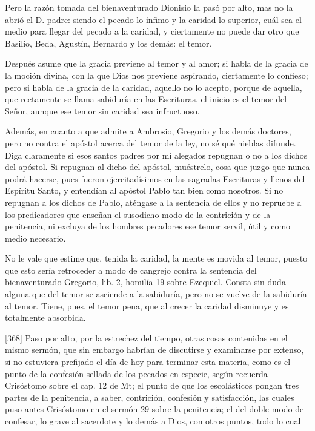 Pero la razón tomada del bienaventurado Dionisio la pasó por alto, mas no la abrió el D. padre: siendo el pecado lo ínfimo y la caridad lo superior, cuál sea el medio para llegar del pecado a la caridad, y ciertamente no puede dar otro que Basilio, Beda, Agustín, Bernardo y los demás: el temor.

Después asume que la gracia previene al temor y al amor; si habla de la gracia de la moción divina, con la que Dios nos previene aspirando, ciertamente lo confieso; pero si habla de la gracia de la caridad, aquello no lo acepto, porque de aquella, que rectamente se llama sabiduría en las Escrituras, el inicio es el temor del Señor, aunque ese temor sin caridad sea infructuoso.

Además, en cuanto a que admite a Ambrosio, Gregorio y los demás doctores, pero no contra el apóstol acerca del temor de la ley, no sé qué nieblas difunde. Diga claramente si esos santos padres por mí alegados repugnan o no a los dichos del apóstol. Si repugnan al dicho del apóstol, muéstrelo, cosa que juzgo que nunca podrá hacerse, pues fueron ejercitadísimos en las sagradas Escrituras y llenos del Espíritu Santo, y entendían al apóstol Pablo tan bien como nosotros. Si no repugnan a los dichos de Pablo, aténgase a la sentencia de ellos y no repruebe a los predicadores que enseñan el susodicho modo de la contrición y de la penitencia, ni excluya de los hombres pecadores ese temor servil, útil y como medio necesario.

No le vale que estime que, tenida la caridad, la mente es movida al temor, puesto que esto sería retroceder a modo de cangrejo contra la sentencia del bienaventurado Gregorio, lib. 2, homilía 19 sobre Ezequiel. Consta sin duda alguna que del temor se asciende a la sabiduría, pero no se vuelve de la sabiduría al temor. Tiene, pues, el temor pena, que al crecer la caridad disminuye y es totalmente absorbida.

[368] Paso por alto, por la estrechez del tiempo, otras cosas contenidas en el mismo sermón, que sin embargo habrían de discutirse y examinarse por extenso, si no estuviera prefijado el día de hoy para terminar esta materia, como es el punto de la confesión sellada de los pecados en especie, según recuerda Crisóstomo sobre el cap. 12 de Mt; el punto de que los escolásticos pongan tres partes de la penitencia, a saber, contrición, confesión y satisfacción, las cuales puso antes Crisóstomo en el sermón 29 sobre la penitencia; el del doble modo de confesar, lo grave al sacerdote y lo demás a Dios, con otros puntos, todo lo cual

